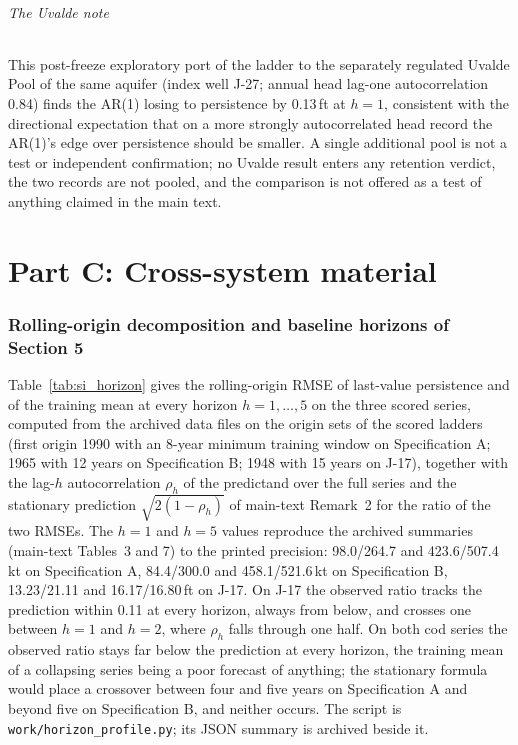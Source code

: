 \documentclass[preprint,11pt,authoryear]{elsarticle}
\theoremstyle{remark}
\begin{document}
\paragraph{The Uvalde note} This post-freeze exploratory port of the ladder to the separately regulated Uvalde Pool of the same aquifer (index well J-27; annual head lag-one autocorrelation 0.84) finds the AR(1) losing to persistence by 0.13\,ft at $h=1$, consistent with the directional expectation that on a more strongly autocorrelated head record the AR(1)'s edge over persistence should be smaller. A single additional pool is not a test or independent confirmation; no Uvalde result enters any retention verdict, the two records are not pooled, and the comparison is not offered as a test of anything claimed in the main text.
\FloatBarrier
\part*{Part C: Cross-system material}

\section{Rolling-origin decomposition and baseline horizons of Section 5}\label{si:horizon}

Table~\ref{tab:si_horizon} gives the rolling-origin RMSE of last-value persistence and of the training mean at every horizon $h=1,\dots,5$ on the three scored series, computed from the archived data files on the origin sets of the scored ladders (first origin 1990 with an 8-year minimum training window on Specification A; 1965 with 12 years on Specification B; 1948 with 15 years on J-17), together with the lag-$h$ autocorrelation $\rho_h$ of the predictand over the full series and the stationary prediction $\sqrt{2(1-\rho_h)}$ of main-text Remark~2 for the ratio of the two RMSEs. The $h=1$ and $h=5$ values reproduce the archived summaries (main-text Tables~3 and 7) to the printed precision: 98.0/264.7 and 423.6/507.4\,kt on Specification A, 84.4/300.0 and 458.1/521.6\,kt on Specification B, 13.23/21.11 and 16.17/16.80\,ft on J-17. On J-17 the observed ratio tracks the prediction within 0.11 at every horizon, always from below, and crosses one between $h=1$ and $h=2$, where $\rho_h$ falls through one half. On both cod series the observed ratio stays far below the prediction at every horizon, the training mean of a collapsing series being a poor forecast of anything; the stationary formula would place a crossover between four and five years on Specification A and beyond five on Specification B, and neither occurs. The script is \texttt{work/horizon\_profile.py}; its JSON summary is archived beside it.
\end{document}
